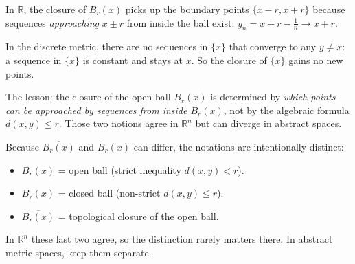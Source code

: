 \begin{remark*}
In $\mathbb{R}$, the closure of $B_r(x)$ picks up the boundary points
$\{x-r, x+r\}$ because sequences \emph{approaching} $x \pm r$ from inside
the ball exist: $y_n = x + r - \tfrac{1}{n} \to x + r$.

In the discrete metric, there are no sequences in $\{x\}$
that converge to any $y \neq x$: a sequence in $\{x\}$ is constant
and stays at $x$.
So the closure of $\{x\}$ gains no new points.

\medskip
\noindent
The lesson: the closure of the open ball $B_r(x)$ is determined by
\emph{which points can be approached by sequences from inside $B_r(x)$},
not by the algebraic formula $d(x,y) \le r$.
Those two notions agree in $\mathbb{R}^n$ but can diverge in abstract spaces.
\end{remark*}

\begin{remark*}
Because $\overline{B_r(x)}$ and $\overline{B}_r(x)$ can differ,
the notations are intentionally distinct:
\begin{itemize}
  \item $B_r(x)$ = open ball (strict inequality $d(x,y) < r$).
  \item $\overline{B}_r(x)$ = closed ball (non-strict $d(x,y) \le r$).
  \item $\overline{B_r(x)}$ = topological closure of the open ball.
\end{itemize}
In $\mathbb{R}^n$ these last two agree, so the distinction rarely matters
there. In abstract metric spaces, keep them separate.
\end{remark*}
